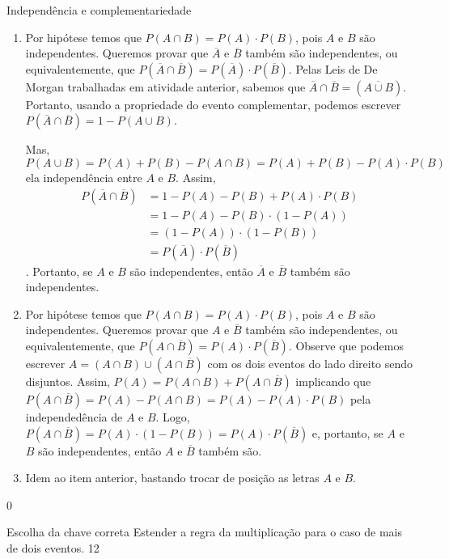 \begin{answer}{Independência e complementariedade}
{
\begin{enumerate}
\item Por hipótese temos que $P(A\cap B)=P(A)\cdot P(B)$, pois $A$ e $B$ são independentes. Queremos provar que $\overline{A}$ e $\overline{B}$ também são independentes, ou equivalentemente, que $P(\overline{A}\cap \overline{B})=P(\overline{A})\cdot P(\overline{B})$.
Pelas Leis de De Morgan trabalhadas em atividade anterior, sabemos que $\overline{A}\cap \overline{B}=(\overline{A\cup B})$. Portanto, usando a propriedade do evento complementar, podemos escrever $P(\overline{A}\cap \overline{B})=1−P(A\cup B)$.

Mas, 
\begin{equation*}
P(A\cup B)=P(A)+P(B)-P(A\cap B)=P(A)+P(B)-P(A)\cdot P(B)
\end{equation*}
ela independência entre $A$ e $B$. Assim,
\begin{align*}
P(\overline{A}\cap \overline{B})&=1-P(A)-P(B)+P(A)\cdot P(B)\\ 
&=1-P(A)-P(B)\cdot(1−P(A))\\
&=(1−P(A))\cdot(1-P(B))\\
&=P(\overline{A})\cdot P(\overline{B})
\end{align*}.
Portanto, se $A$ e $B$ são independentes, então $\overline{A}$ e $\overline{B}$ também são independentes.

\item Por hipótese temos que $P(A\cap B)=P(A)\cdot P(B)$, pois $A$ e $B$ são independentes. Queremos provar que $A$ e $\overline{B}$ também são independentes, ou equivalentemente, que $P(A\cap \overline{B})=P(A)\cdot P(\overline{B})$. Observe que podemos escrever $A=(A\cap B)\cup (A\cap\overline{B})$ com os dois eventos do lado direito sendo disjuntos. Assim, $P(A)=P(A\cap B)+P(A\cap \overline{B})$ implicando que $P(A\cap \overline{B})=P(A)-P(A\cap B)=P(A)-P(A)\cdot P(B)$ pela independedência de $A$ e $B$. Logo, $P(A\cap \overline{B})=P(A)\cdot(1−P(B))=P(A)\cdot P(\overline{B})$ e, portanto, se $A$ e $B$ são independentes, então $A$ e $\overline{B}$ também são.
\item Idem ao item anterior, bastando trocar de posição as letras $A$ e $B$.
\end{enumerate}
}{0}
\end{answer}
\begin{objectives}{Escolha da chave correta}
{
Estender a regra da multiplicação para o caso de mais de dois eventos.
}{1}{2}
\end{objectives}
